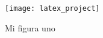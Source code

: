 \lipsum[1-1] \cite{knuth:1984}

\begin{figure}[H]
    \centering
    \texttt{[image: latex\_project]}
    \caption{Mi figura uno}\label{fig:fig1}
\end{figure}